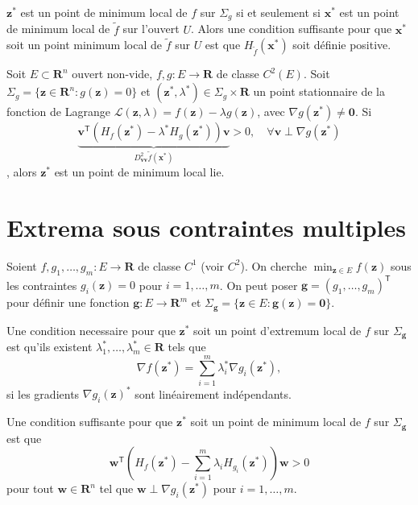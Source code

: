 \begin{remark}
$\boldsymbol{z}^{*}$ est un point de minimum local de $f$ sur $\Sigma _{g}$ si et seulement si $\boldsymbol{x}^{*}$ est un point de minimum local de $\tilde{f}$ sur l'ouvert $U$. Alors une condition suffisante pour que $\boldsymbol{x}^{*}$ soit un point minimum local de $\tilde{f}$ sur $U$ est que $H_{\tilde{f}}(\boldsymbol{x}^{*})$ soit définie positive.
\end{remark}
\begin{theorem}
Soit $E\subset \mathbf{R}^{n}$ ouvert non-vide, $f,g:E\to \mathbf{R}$ de classe $C^{2}(E)$. Soit $\Sigma _{g}=\{ \boldsymbol{z}\in \mathbf{R}^{n}:g(\boldsymbol{z})=0 \}$ et $(\boldsymbol{z}^{*},\lambda ^{*})\in\Sigma _{g}\times \mathbf{R}$  un point stationnaire de la fonction de Lagrange $\mathcal{L}(\boldsymbol{z},\lambda)=f(\boldsymbol{z})-\lambda g(\boldsymbol{z})$, avec $\nabla g(\boldsymbol{z}^{*})\neq \boldsymbol{0}$. Si 
$$\underbrace{ 
\boldsymbol{v}^{\mathsf{T}}(H_{f}(\boldsymbol{z}^{*})-\lambda ^{*}H_{g}(\boldsymbol{z}^{*}))\boldsymbol{v} }_{ D^{2}_{\boldsymbol{vv}}\tilde{f}(\boldsymbol{x}^{*}) }>0,\quad \forall \boldsymbol{v}\perp \nabla g(\boldsymbol{z}^{*})
$$
, alors $\boldsymbol{z}^{*}$ est un point de minimum local lie.
\end{theorem}

\section{Extrema sous contraintes multiples}

Soient $f,g_{1},\dots,g_{m}:E\to \mathbf{R}$ de classe $C^{1}$ (voir $C^{2}$). On cherche $\min_{\boldsymbol{z}\in E}f(\boldsymbol{z})$ sous les contraintes $g_{i}(\boldsymbol{z})=0$ pour $i=1,\dots,m$. On peut poser $\boldsymbol{g}=(g_{1},\dots,g_{m})^{\mathsf{T}}$ pour définir une fonction $\boldsymbol{g}:E\to \mathbf{R}^{m}$ et $\Sigma _{\boldsymbol{g}}=\{ \boldsymbol{z}\in E:\boldsymbol{g}(\boldsymbol{z})=\boldsymbol{0} \}$. 
\begin{theorem}
Une condition necessaire pour que $\boldsymbol{z}^{*}$ soit un point d'extremum local de $f$ sur $\Sigma _{\boldsymbol{g}}$ est qu'ils existent $\lambda_{1}^{*},\dots,\lambda _{m}^{*}\in \mathbf{R}$ tels que 
$$
\nabla f(\boldsymbol{z}^{*})=\sum_{i=1}^{m} \lambda _{i}^{*}\nabla g_{i}(\boldsymbol{z}^{*}),
$$
si les gradients $\nabla g_{i}(\boldsymbol{z})^{*}$ sont linéairement indépendants.
\end{theorem}
\begin{theorem}
Une condition suffisante pour que $\boldsymbol{z}^{*}$ soit un point de minimum local de $f$ sur $\Sigma _{\boldsymbol{g}}$ est que 
$$
\boldsymbol{w}^{\mathsf{T}}\left( H_{f}(\boldsymbol{z}^{*})-\sum_{i=1}^{m} \lambda _{i}H_{g_{i}}(\boldsymbol{z}^{*}) \right)\boldsymbol{w}>0
$$
pour tout $\boldsymbol{w}\in \mathbf{R}^{n}$ tel que $\boldsymbol{w}\perp \nabla g_{i}(\boldsymbol{z}^{*})$ pour $i=1,\dots,m$.
\end{theorem}

